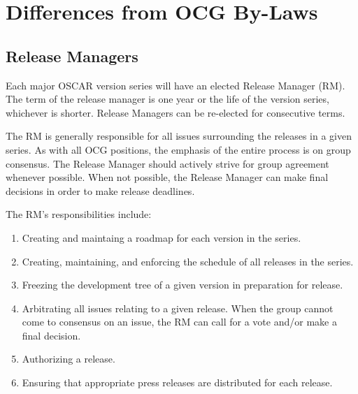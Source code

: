 %
%
%

\section{Differences from OCG By-Laws}


\subsection{Release Managers}

Each major OSCAR version series will have an elected Release Manager
(RM).  The term of the release manager is one year or the life of the
version series, whichever is shorter.  Release Managers can be
re-elected for consecutive terms.

The RM is generally responsible for all issues surrounding the
releases in a given series.  As with all OCG positions, the emphasis
of the entire process is on group consensus.  The Release Manager
should actively strive for group agreement whenever possible.  When
not possible, the Release Manager can make final decisions in order to
make release deadlines.

The RM's responsibilities include:

\begin{enumerate}
\item Creating and maintaing a roadmap for each version in the series.
  
\item Creating, maintaining, and enforcing the schedule of all
  releases in the series.

\item Freezing the development tree of a given version in preparation
  for release.

\item Arbitrating all issues relating to a given release.  When the
  group cannot come to consensus on an issue, the RM can call for a
  vote and/or make a final decision.

\item Authorizing a release.
  
\item Ensuring that appropriate press releases are distributed for
  each release.
\end{enumerate}

